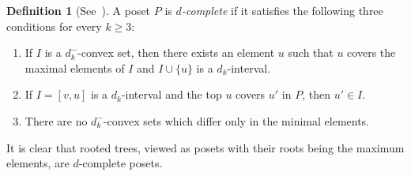 \documentclass[10pt]{amsart}
\theoremstyle{definition}
\newtheorem{defi}[theo]{Definition}
\theoremstyle{remark}
\begin{document}
\begin{defi}[See~\cite{Okada, PS}]
\label{def:dc_poset}
A poset $P$ is \emph{$d$-complete} if it satisfies 
the following three conditions for every $k \ge 3$:
\begin{enumerate}[(D1)]
\item\label{defi2.1_D1} %
If $I$ is a $d_k^-$-convex set, then there exists an element $u$ 
such that $u$ covers the maximal elements of $I$ and 
$I \cup \{ u \}$ is a $d_k$-interval.
\item\label{defi2.1_D2} %
If $I = [v,u]$ is a $d_k$-interval and the top $u$ covers $u'$ in $P$, 
then $u' \in I$.
\item\label{defi2.1_D3} %
There are no $d_k^-$-convex sets which differ only in the minimal elements.
\end{enumerate}
\end{defi}

It is clear that rooted trees, viewed as posets with their roots being the maximum elements, 
are $d$-complete posets.
\end{document}
